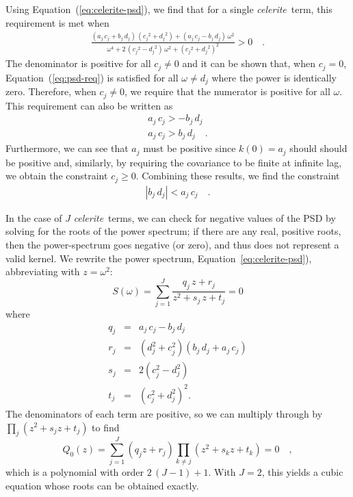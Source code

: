 \documentclass[manuscript, letterpaper]{aastex6}
\newcommand{\celeriteterm}{\emph{celerite}}
\renewcommand{\eqref}[1]{\ref{eq:#1}}
\newcommand{\Eq}[1]{Equation~(\eqref{#1})}
\newcommand{\eq}[1]{\Eq{#1}}
\newcommand{\eqalt}[1]{Equation~\eqref{#1}}
\newcommand{\eqlabel}[1]{\label{eq:#1}}
\begin{document}
Using \eq{celerite-psd}, we find that for a single \celeriteterm\ term, this
requirement is met when
\begin{eqnarray}\eqlabel{psd-req}
\frac{(a_j\,c_j+b_j\,d_j)\,({c_j}^2+{d_j}^2)+(a_j\,c_j-b_j\,d_j)\,\omega^2}
{\omega^4+2\,({c_j}^2-{d_j}^2)\,\omega^2+{({c_j}^2+{d_j}^2)}^2} > 0 \quad.
\end{eqnarray}
The denominator is positive for all $c_j \ne 0$ and it can be shown that, when
$c_j=0$, \eq{psd-req} is satisfied for all $\omega \ne d_j$ where the power is
identically zero.
Therefore, when $c_j \ne 0$, we require that the numerator is positive for all
$\omega$.
This requirement can also be written as
\begin{eqnarray}
a_j\,c_j > -b_j\,d_j \\
a_j\,c_j > b_j\,d_j \quad.
\end{eqnarray}
Furthermore, we can see that $a_j$ must be positive since $k(0) = a_j$ should
should be positive and, similarly, by requiring the covariance to be finite at
infinite lag, we obtain the constraint $c_j \ge 0$.
Combining these results, we find the constraint
\begin{eqnarray}
    |b_j\,d_j| < a_j\,c_j \quad.
\end{eqnarray}

In the case of $J$ \celeriteterm\ terms, we can check for negative values of the
PSD by solving for the roots of the power spectrum; if there are any real,
positive roots, then the power-spectrum goes negative (or zero), and thus does not
represent a valid kernel. We rewrite the power spectrum, \eqalt{celerite-psd}),
abbreviating with $z = \omega^2$:
\begin{equation}
S(\omega)=  \sum_{j=1}^J \frac{q_j\,z + r_j}{z^2+s_j\,z + t_j} = 0
\end{equation}
where
\begin{eqnarray}
q_j &=& a_j\,c_j-b_j\,d_j\\
r_j &=& (d_j^2+c_j^2)(b_j\,d_j+a_j\,c_j)\\
s_j &=& 2(c_j^2-d_j^2)\\
t_j &=& (c_j^2+d_j^2)^2.
\end{eqnarray}
The denominators of each term are positive, so we can multiply through by
$\prod_j \left(z^2+s_jz + t_j\right)$ to find
\begin{equation}
Q_0(z) = \sum_{j=1}^J (q_j z + r_j)\prod_{k \ne j}\left(z^2+s_kz +
    t_k\right) = 0\quad,
\end{equation}
which is a polynomial with order $2\,(J-1)+1$.
With $J=2$, this yields a cubic equation whose roots can be obtained exactly.
\end{document}
